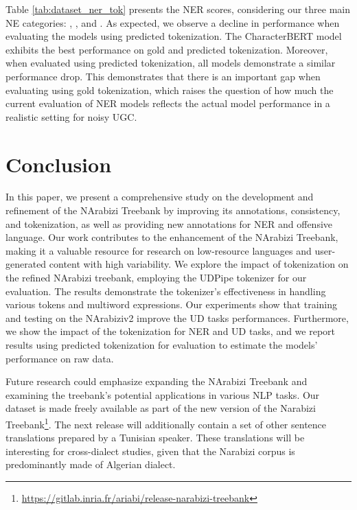 \documentclass[11pt]{article}
\newcommand{\org}{{\sc {\tt ORG}}\xspace}
\newcommand{\loc}{{\sc {\tt LOC}}\xspace}
\newcommand{\per}{{\sc {\tt PER}}\xspace}
\begin{document}
Table \ref{tab:dataset_ner_tok} presents the NER scores, considering our three main NE categories: \per, \loc, and \org. As expected, we observe a decline in performance when evaluating the models using predicted tokenization. The CharacterBERT model exhibits the best performance on gold and predicted tokenization. Moreover, when evaluated using predicted tokenization, all models demonstrate a similar performance drop. This demonstrates that there is an important gap when evaluating using gold tokenization, which raises the question of how much the current evaluation of NER models reflects the actual model performance in a realistic setting for noisy UGC.

\section{Conclusion}
In this paper, we present a comprehensive study on the development and refinement of the NArabizi Treebank \cite{seddah-etal-2020-building} by improving its annotations, consistency, and tokenization, as well as providing new annotations for NER and offensive language. Our work contributes to the enhancement of the NArabizi Treebank, making it a valuable resource for research on low-resource languages and user-generated content with high variability. We explore the impact of tokenization on the refined NArabizi treebank, employing the UDPipe tokenizer for our evaluation. The results demonstrate the tokenizer's effectiveness in handling various tokens and multiword expressions. Our experiments show that training and testing on the NArabiziv2 improve the UD tasks performances. Furthermore, we show the impact of the tokenization for NER and UD tasks, and we report results using predicted tokenization for evaluation to estimate the models' performance on raw data.     

Future research could emphasize expanding the NArabizi Treebank  and examining the treebank's potential applications in various NLP tasks. Our dataset is made freely available as part of the new version of the Narabizi Treebank\footnote{\url{https://gitlab.inria.fr/ariabi/release-narabizi-treebank}}.
The next release will additionally contain a set of other sentence translations  prepared by a Tunisian speaker.  These translations will be interesting for cross-dialect studies, given that the Narabizi corpus is predominantly made of Algerian dialect.
\end{document}

